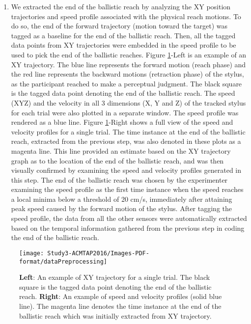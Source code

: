 \begin{enumerate}
	\item We extracted the end of the ballistic reach by analyzing the XY position trajectories and speed profile associated with the physical reach motions. To do so, the end of the forward trajectory (motion toward the target) was tagged as a baseline for the end of the ballistic reach. Then, all the tagged data points from XY trajectories were embedded in the speed profile to be used to pick the end of the ballistic reaches. Figure \ref{fig:dataPreprocessing}-Left is an example of an XY trajectory. The blue line represents the forward motion (reach phase) and the red line represents the backward motions (retraction phase) of the stylus, as the participant reached to make a perceptual judgment. The black square is the tagged data point denoting the end of the ballistic reach. The speed (XYZ) and the velocity in all 3 dimensions (X, Y and Z) of the tracked stylus for each trial were also plotted in a separate window. The speed profile was rendered as a blue line. Figure \ref{fig:dataPreprocessing}-Right shows a full view of the speed and velocity profiles for a single trial. The time instance at the end of the ballistic reach, extracted from the previous step, was also denoted in these plots as a magenta line. This line provided an estimate based on the XY trajectory graph as to the location of the end of the ballistic reach, and was then visually confirmed by examining the speed and velocity profiles generated in this step. The end of the ballistic reach was chosen by the experimenter examining the speed profile as the first time instance when the speed reaches a local minima below a threshold of 20 cm/s, immediately after attaining peak speed caused by the forward motion of the stylus. After tagging the speed profile, the data from all the other sensors were automatically extracted based on the temporal information gathered from the previous step in coding the end of the ballistic reach. 
	
\end{enumerate}

\begin{figure}[ht]
	\centering
	\texttt{[image: Study3-ACMTAP2016/Images-PDF-format/dataPreprocessing]}
	\caption{\textbf{Left}: An example of XY trajectory for a single trial. The black square is the tagged data point denoting the end of the ballistic reach. \textbf{Right}: An example of speed and velocity profiles (solid blue line). The magenta line denotes the time instance at the end of the ballistic reach which was initially extracted from XY trajectory.}
	\label{fig:dataPreprocessing}
\end{figure}


